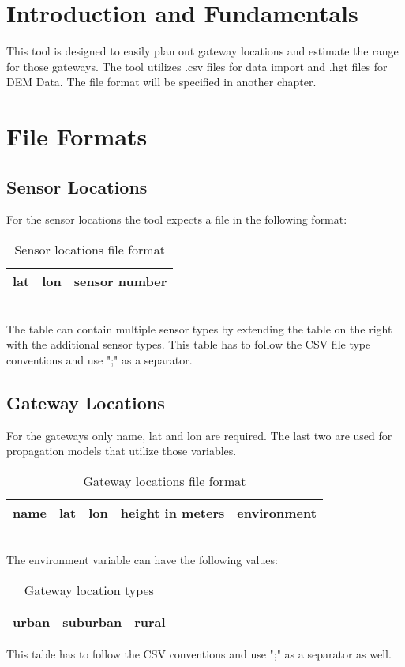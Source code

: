 \documentclass[12pt,a4paper]{article}
\date{}
\author{\auth}
\title{\thetitle}
\begin{document}
\maketitle
\tableofcontents
\thispagestyle{empty}
\pagebreak
\section{Introduction and Fundamentals}
This tool is designed to easily plan out gateway locations and estimate the range for those gateways. The tool utilizes .csv files for data import and .hgt files for DEM Data. The file format will be specified in another chapter.
\section{File Formats}
\subsection{Sensor Locations}
For the sensor locations the tool expects a file in the following format:\\
\begin{table}[!th]
\centering
\caption{Sensor locations file format}
\begin{tabular}{|c|c|c|}
	\hline
	lat & lon & sensor number \\
	\hline
\end{tabular}
\end{table}
\\
The table can contain multiple sensor types by extending the table on the right with the additional sensor types. This table has to follow the CSV file type conventions and use ";" as a separator.
\subsection{Gateway Locations}
For the gateways only name, lat and lon are required. The last two are used for propagation models that utilize those variables.
\begin{table}[!th]
	\centering
	\caption{Gateway locations file format}
	\begin{tabular}{|c|c|c|c|c|}
	\hline
	name&lat&lon&height in meters&environment \\
	\hline
\end{tabular}
\end{table}
\\
The environment variable can have the following values:\\
\begin{table}[!th]
	\centering
	\caption{Gateway location types}
	\begin{tabular}{|c|c|c|}
	\hline
	urban&suburban&rural \\
	\hline
\end{tabular}
\end{table}
This table has to follow the CSV conventions and use ";" as a separator as well.
\end{document}
